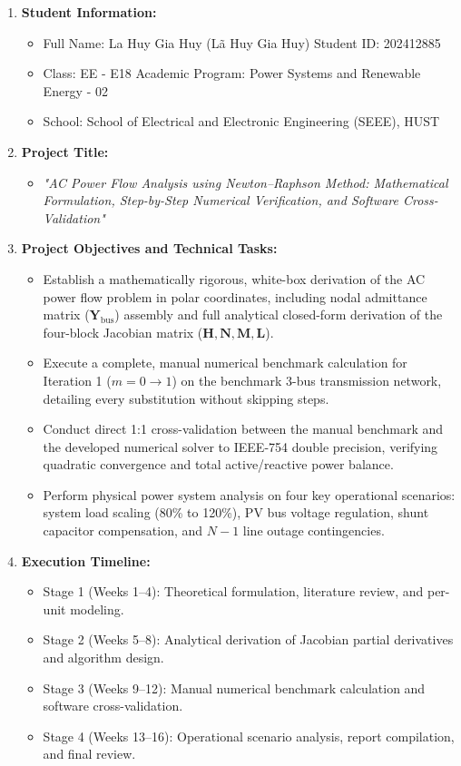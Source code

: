 \documentclass[12pt,a4paper,oneside]{report}
\begin{document}
\begin{enumerate}
    \item \textbf{Student Information:}
    \begin{itemize}
        \item Full Name: La Huy Gia Huy (Lã Huy Gia Huy) \quad Student ID: 202412885
        \item Class: EE - E18 \quad Academic Program: Power Systems and Renewable Energy - 02
        \item School: School of Electrical and Electronic Engineering (SEEE), HUST
    \end{itemize}
    \item \textbf{Project Title:}
    \begin{itemize}
        \item \textit{"AC Power Flow Analysis using Newton--Raphson Method: Mathematical Formulation, Step-by-Step Numerical Verification, and Software Cross-Validation"}
    \end{itemize}
    \item \textbf{Project Objectives and Technical Tasks:}
    \begin{itemize}
        \item Establish a mathematically rigorous, white-box derivation of the AC power flow problem in polar coordinates, including nodal admittance matrix ($\mathbf{Y}_{\text{bus}}$) assembly and full analytical closed-form derivation of the four-block Jacobian matrix ($\mathbf{H}, \mathbf{N}, \mathbf{M}, \mathbf{L}$).
        \item Execute a complete, manual numerical benchmark calculation for Iteration 1 ($m = 0 \to 1$) on the benchmark 3-bus transmission network, detailing every substitution without skipping steps.
        \item Conduct direct 1:1 cross-validation between the manual benchmark and the developed numerical solver to IEEE-754 double precision, verifying quadratic convergence and total active/reactive power balance.
        \item Perform physical power system analysis on four key operational scenarios: system load scaling (80\% to 120\%), PV bus voltage regulation, shunt capacitor compensation, and $N-1$ line outage contingencies.
    \end{itemize}
    \item \textbf{Execution Timeline:}
    \begin{itemize}
        \item Stage 1 (Weeks 1--4): Theoretical formulation, literature review, and per-unit modeling.
        \item Stage 2 (Weeks 5--8): Analytical derivation of Jacobian partial derivatives and algorithm design.
        \item Stage 3 (Weeks 9--12): Manual numerical benchmark calculation and software cross-validation.
        \item Stage 4 (Weeks 13--16): Operational scenario analysis, report compilation, and final review.
    \end{itemize}
\end{enumerate}
\end{document}
